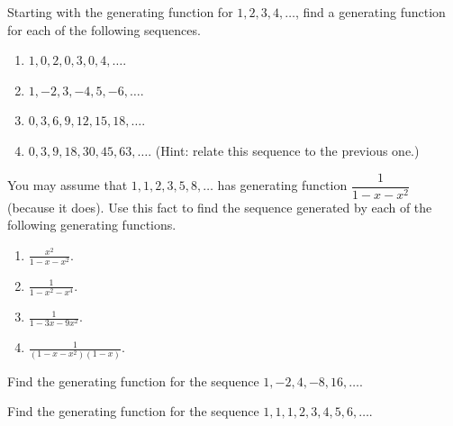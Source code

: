 \documentclass[10pt,]{book}
\theoremstyle{plain}
\theoremstyle{definition}
\theoremstyle{definition}
\theoremstyle{definition}
\theoremstyle{definition}
\numberwithin{equation}{chapter}
\begin{document}
\begin{divisionexercise}{12}\hypertarget{exercise-95}{}
\hypertarget{p-1040}{}%
Starting with the generating function for \(1,2,3,4, \ldots\), find a generating function for each of the following sequences.%
\par
\hypertarget{p-1041}{}%
\leavevmode%
\begin{enumerate}[label=(\alph*)]
\item\hypertarget{li-190}{}\(1, 0, 2, 0, 3, 0, 4,\ldots\).%
\item\hypertarget{li-191}{}\(1, -2, 3, -4, 5, -6, \ldots\).%
\item\hypertarget{li-192}{}\(0, 3, 6, 9, 12, 15, 18, \ldots\).%
\item\hypertarget{li-193}{}\(0, 3, 9, 18, 30, 45, 63,\ldots\). (Hint: relate this sequence to the previous one.)%
\end{enumerate}
%
\end{divisionexercise}%
\begin{divisionexercise}{13}\hypertarget{exercise-96}{}
\hypertarget{p-1043}{}%
You may assume that \(1, 1, 2, 3, 5, 8,\ldots\) has generating function \(\dfrac{1}{1-x-x^2}\) (because it does). Use this fact to find the sequence generated by each of the following generating functions.%
\par
\hypertarget{p-1044}{}%
\leavevmode%
\begin{enumerate}[label=(\alph*)]
\item\hypertarget{li-198}{}\(\frac{x^2}{1-x-x^2}\).%
\item\hypertarget{li-199}{}\(\frac{1}{1-x^2-x^4}\).%
\item\hypertarget{li-200}{}\(\frac{1}{1-3x-9x^2}\).%
\item\hypertarget{li-201}{}\(\frac{1}{(1-x-x^2)(1-x)}\).%
\end{enumerate}
%
\end{divisionexercise}%
\begin{divisionexercise}{14}\hypertarget{exercise-97}{}
\hypertarget{p-1046}{}%
Find the generating function for the sequence \(1, -2, 4, -8, 16, \ldots\).%
\end{divisionexercise}%
\begin{divisionexercise}{15}\hypertarget{exercise-98}{}
\hypertarget{p-1048}{}%
Find the generating function for the sequence \(1, 1, 1, 2, 3, 4, 5, 6, \ldots\).%
\end{divisionexercise}%
\end{document}

